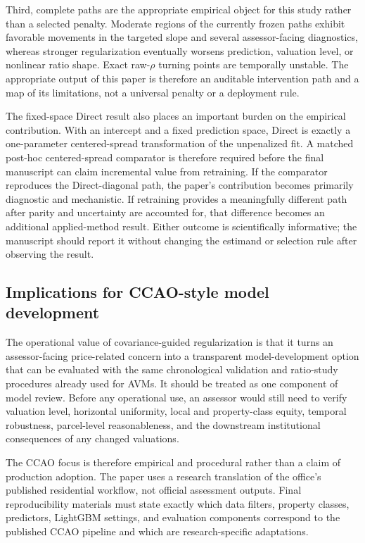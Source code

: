 \documentclass[10pt]{article}
\theoremstyle{definition}
\newcommand{\1}{\mathbf{1}}
\begin{document}
Third, complete paths are the appropriate empirical object for this study rather than a selected penalty. Moderate regions of the currently frozen paths exhibit favorable movements in the targeted slope and several assessor-facing diagnostics, whereas stronger regularization eventually worsens prediction, valuation level, or nonlinear ratio shape. Exact raw-$\rho$ turning points are temporally unstable. The appropriate output of this paper is therefore an auditable intervention path and a map of its limitations, not a universal penalty or a deployment rule.

The fixed-space Direct result also places an important burden on the empirical contribution. With an intercept and a fixed prediction space, Direct is exactly a one-parameter centered-spread transformation of the unpenalized fit. A matched post-hoc centered-spread comparator is therefore required before the final manuscript can claim incremental value from retraining. If the comparator reproduces the Direct-diagonal path, the paper's contribution becomes primarily diagnostic and mechanistic. If retraining provides a meaningfully different path after parity and uncertainty are accounted for, that difference becomes an additional applied-method result. Either outcome is scientifically informative; the manuscript should report it without changing the estimand or selection rule after observing the result.

\subsection{Implications for CCAO-style model development}
The operational value of covariance-guided regularization is that it turns an assessor-facing price-related concern into a transparent model-development option that can be evaluated with the same chronological validation and ratio-study procedures already used for AVMs. It should be treated as one component of model review. Before any operational use, an assessor would still need to verify valuation level, horizontal uniformity, local and property-class equity, temporal robustness, parcel-level reasonableness, and the downstream institutional consequences of any changed valuations.

The CCAO focus is therefore empirical and procedural rather than a claim of production adoption. The paper uses a research translation of the office's published residential workflow, not official assessment outputs. Final reproducibility materials must state exactly which data filters, property classes, predictors, LightGBM settings, and evaluation components correspond to the published CCAO pipeline and which are research-specific adaptations.
\end{document}
